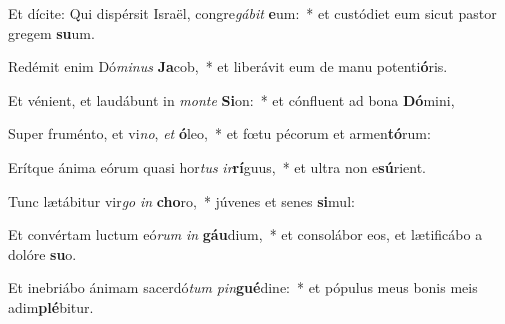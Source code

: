 \item Et dícite: Qui dispérsit Israël, congre\textit{gá}\textit{bit} \textbf{e}um:~* et custódiet eum sicut pastor gregem \textbf{su}um.
\item Redémit enim Dó\textit{mi}\textit{nus} \textbf{Ja}cob,~* et liberávit eum de manu potenti\textbf{ó}ris.
\item Et vénient, et laudábunt in \textit{mon}\textit{te} \textbf{Si}on:~* et cónfluent ad bona \textbf{Dó}mini,
\item Super fruménto, et vi\textit{no}, \textit{et} \textbf{ó}leo,~* et fœtu pécorum et armen\textbf{tó}rum:
\item Erítque ánima eórum quasi hor\textit{tus} \textit{ir}\textbf{rí}guus,~* et ultra non e\textbf{sú}rient.
\item Tunc lætábitur vir\textit{go} \textit{in} \textbf{cho}ro,~* júvenes et senes \textbf{si}mul:
\item Et convértam luctum eó\textit{rum} \textit{in} \textbf{gáu}dium,~* et consolábor eos, et lætificábo a dolóre \textbf{su}o.
\item Et inebriábo ánimam sacerdó\textit{tum} \textit{pin}\textbf{gué}dine:~* et pópulus meus bonis meis adim\textbf{plé}bitur.
